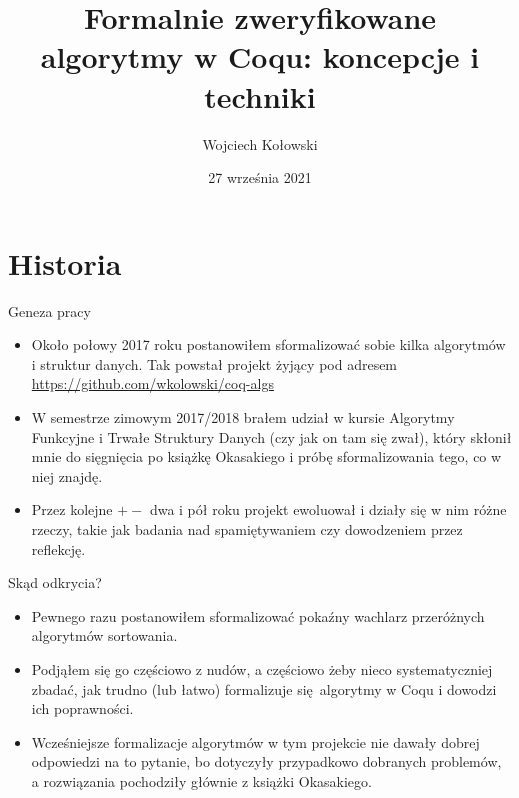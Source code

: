\documentclass{beamer}
\title{Formalnie zweryfikowane algorytmy w Coqu: koncepcje i techniki}
\author{Wojciech Kołowski}
\date{27 września 2021}
\begin{document}
\frame{\titlepage}

\frame{\tableofcontents}

\section{Historia}

\begin{frame}{Geneza pracy}
\begin{itemize}
	\item Około połowy 2017 roku postanowiłem sformalizować sobie kilka algorytmów i struktur danych. Tak powstał projekt żyjący pod adresem \url{https://github.com/wkolowski/coq-algs}
	\item W semestrze zimowym 2017/2018 brałem udział w kursie Algorytmy Funkcyjne i Trwałe Struktury Danych (czy jak on tam się zwał), który skłonił mnie do sięgnięcia po książkę Okasakiego i próbę sformalizowania tego, co w niej znajdę.
	\item Przez kolejne $+-$ dwa i pół roku projekt ewoluował i działy się w nim różne rzeczy, takie jak badania nad spamiętywaniem czy dowodzeniem przez reflekcję.
\end{itemize}
\end{frame}

\begin{frame}{Skąd odkrycia?}
\begin{itemize}
	\item Pewnego razu postanowiłem sformalizować pokaźny wachlarz przeróżnych algorytmów sortowania.
	\item Podjąłem się go częściowo z nudów, a częściowo żeby nieco systematyczniej zbadać, jak trudno (lub łatwo) formalizuje się algorytmy w Coqu i dowodzi ich poprawności.
	\item Wcześniejsze formalizacje algorytmów w tym projekcie nie dawały dobrej odpowiedzi na to pytanie, bo dotyczyły przypadkowo dobranych problemów, a rozwiązania pochodziły głównie z książki Okasakiego.
\end{itemize}
\end{frame}
\end{document}

